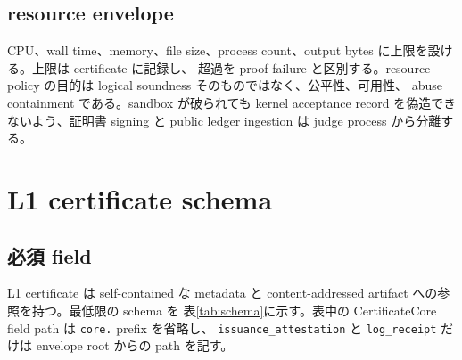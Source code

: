 \documentclass[a4paper,11pt]{ltjsarticle}
\newcommand{\code}[1]{\texttt{#1}}
\begin{document}
\subsection{resource envelope}

CPU、wall time、memory、file size、process count、output bytes に上限を設ける。上限は certificate に記録し、
超過を proof failure と区別する。resource policy の目的は logical soundness そのものではなく、公平性、可用性、
abuse containment である。sandbox が破られても kernel acceptance record を偽造できないよう、証明書 signing と
public ledger ingestion は judge process から分離する。

\section{L1 certificate schema}

\subsection{必須 field}

L1 certificate は self-contained な metadata と content-addressed artifact への参照を持つ。最低限の schema を
表\ref{tab:schema}に示す。表中の CertificateCore field path は \code{core.} prefix を省略し、
\code{issuance\_attestation} と \code{log\_receipt} だけは envelope root からの path を記す。
\end{document}
